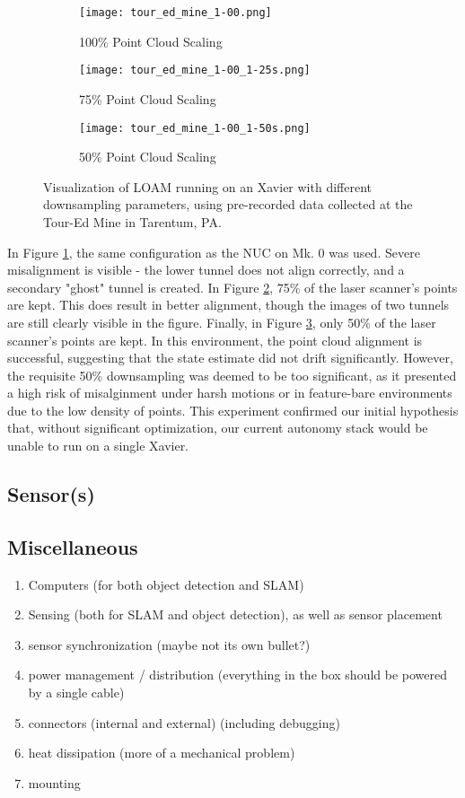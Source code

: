 \begin{figure}
	\centering
	\begin{subfigure}{0.3\textwidth}
		\texttt{[image: tour\_ed\_mine\_1-00.png]}
		\caption{100\% Point Cloud Scaling}
		\label{loam_xavier_100}
	\end{subfigure}		
	\hfill
	\begin{subfigure}{0.3\textwidth}
		\texttt{[image: tour\_ed\_mine\_1-00\_1-25s.png]}
		\caption{75\% Point Cloud Scaling}
		\label{loam_xavier_75}		
	\end{subfigure}
	\hfill
	\begin{subfigure}{0.3\textwidth}
		\texttt{[image: tour\_ed\_mine\_1-00\_1-50s.png]}
		\caption{50\% Point Cloud Scaling}
		\label{loam_xavier_50}
	\end{subfigure}	
	\caption{Visualization of LOAM running on an Xavier with different downsampling parameters, using pre-recorded data collected at the Tour-Ed Mine in Tarentum, PA.}
	\label{loam_xavier}
\end{figure}

In Figure \ref{loam_xavier_100}, the same configuration as the NUC on Mk. 0 was used. Severe misalignment is visible - the lower tunnel does not align correctly, and a secondary "ghost" tunnel is created. In Figure \ref{loam_xavier_75}, 75\% of the laser scanner's points are kept. This does result in better alignment, though the images of two tunnels are still clearly visible in the figure. Finally, in Figure \ref{loam_xavier_50}, only 50\% of the laser scanner's points are kept. In this environment, the point cloud alignment is successful, suggesting that the state estimate did not drift significantly. However, the requisite 50\% downsampling was deemed to be too significant, as it presented a high risk of misalginment under harsh motions or in feature-bare environments due to the low density of points. This experiment confirmed our initial hypothesis that, without significant optimization, our current autonomy stack would be unable to run on a single Xavier.

\subsection{Sensor(s)}
\subsection{Miscellaneous}

\begin{enumerate}
	\item Computers (for both object detection and SLAM)
	\item Sensing (both for SLAM and object detection), as well as sensor placement 
	\item sensor synchronization (maybe not its own bullet?)
	\item power management / distribution (everything in the box should be powered by a single cable)
	\item connectors (internal and external) (including debugging)
	\item heat dissipation (more of a mechanical problem)
	\item mounting
\end{enumerate}
